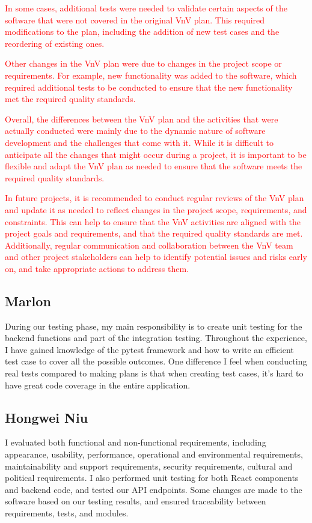 \documentclass[12pt, oneside, openany, titlepage]{article}
\begin{document}
\textcolor{red}{In some cases, additional tests were needed to validate certain aspects of the software that were not covered in the original VnV plan. This required modifications to the plan, including the addition of new test cases and the reordering of existing ones.}

\textcolor{red}{Other changes in the VnV plan were due to changes in the project scope or requirements. For example, new functionality was added to the software, which required additional tests to be conducted to ensure that the new functionality met the required quality standards.}

\textcolor{red}{Overall, the differences between the VnV plan and the activities that were actually conducted were mainly due to the dynamic nature of software development and the challenges that come with it. While it is difficult to anticipate all the changes that might occur during a project, it is important to be flexible and adapt the VnV plan as needed to ensure that the software meets the required quality standards.}

\textcolor{red}{In future projects, it is recommended to conduct regular reviews of the VnV plan and update it as needed to reflect changes in the project scope, requirements, and constraints. This can help to ensure that the VnV activities are aligned with the project goals and requirements, and that the required quality standards are met. Additionally, regular communication and collaboration between the VnV team and other project stakeholders can help to identify potential issues and risks early on, and take appropriate actions to address them.}

\subsection{Marlon}
During our testing phase, my main responsibility is to create unit testing for the backend functions and part of the integration testing. Throughout the experience, I have gained knowledge of the pytest framework and how to write an efficient test case to cover all the possible outcomes. One difference I feel when conducting real tests compared to making plans is that when creating test cases, it's hard to have great code coverage in the entire application. 

\subsection{Hongwei Niu}
I evaluated both functional and non-functional requirements, including appearance, usability, performance, operational and environmental requirements, maintainability and support requirements, security requirements, cultural and political requirements. I also performed unit testing for both React components and backend code, and tested our API endpoints. Some changes are made to the software based on our testing results, and ensured traceability between requirements, tests, and modules.
\end{document}
